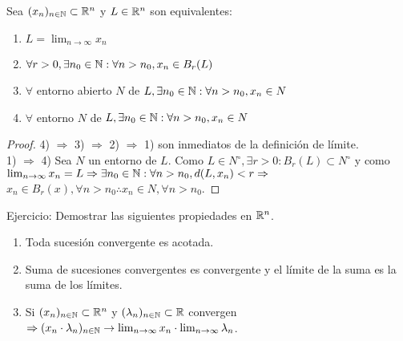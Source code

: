 \begin{prop}
  Sea $(x_n)_{n \in \mathbb{N}} \subset \mathbb{R}^n$ y $L \in \mathbb{R}^n$ son equivalentes:

  \begin{enumerate}
    \item $L = \lim_{n \to \infty} x_n$
    \item $\forall r > 0, \exists n_0 \in \mathbb{N} : \forall n > n_0, x_n \in B_r(L)$
    \item $\forall$ entorno abierto $N$ de $L, \exists n_0 \in \mathbb{N} : \forall n > n_0, x_n \in N$
    \item $\forall$ entorno $N$ de $L, \exists n_0 \in \mathbb{N} : \forall n > n_0, x_n \in N$
  \end{enumerate}

  \begin{proof}
    4) $\Rightarrow$ 3) $\Rightarrow$ 2) $\Rightarrow$ 1) son inmediatos de la definición de límite. \\
    1) $\Rightarrow$ 4) Sea $N$ un entorno de $L$. Como $L \in N^{\circ}, \exists r > 0 : B_r(L) \subset N^{\circ}$ y como $\lim_{n \to \infty} x_n = L \Rightarrow \exists n_0 \in \mathbb{N} : \forall n > n_0, d(L, x_n) < r \Rightarrow$ \\
    $x_n \in B_r(x), \forall n > n_0 \therefore x_n \in N, \forall n > n_0$.
  \end{proof}
\end{prop}

\begin{prop}
  Ejercicio: Demostrar las siguientes propiedades en $\mathbb{R}^n$.
  \begin{enumerate}
    \item Toda sucesión convergente es acotada.
    \item Suma de sucesiones convergentes es convergente y el límite de la suma es la suma de los límites.
    \item Si $(x_n)_{n \in \mathbb{N}} \subset \mathbb{R}^n$ y $(\lambda_n)_{n \in \mathbb{N}} \subset \mathbb{R}$ convergen $\Rightarrow (x_n \cdot \lambda_n)_{n \in \mathbb{N}} \to \lim_{n \to \infty} x_n \cdot \lim_{n \to \infty} \lambda_n$.
  \end{enumerate}
\end{prop}

